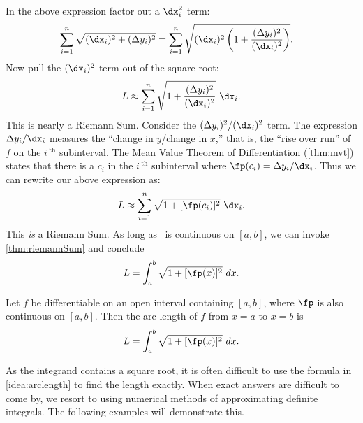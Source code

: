 In the above expression factor out a $\dx_i^2$ term:
\begin{align*}
	\sum_{i=1}^n \sqrt{(\dx_i)^2 + (\Delta y_i)^2}
	&= \sum_{i=1}^n \sqrt{(\dx_i)^2\left(1 + \frac{(\Delta y_i)^2}{(\dx_i)^2}\right)}.
\end{align*}
Now pull the $(\dx_i)^2$ term out of the square root:
\[L\approx\sum_{i=1}^n\sqrt{1 + \frac{(\Delta y_i)^2}{(\dx_i)^2}}\ \dx_i.\]
This is nearly a Riemann Sum. Consider the $(\Delta y_i)^2/(\dx_i)^2$ term. The expression $\Delta y_i/\dx_i$ measures the ``change in $y$/change in $x$,'' that is, the ``rise over run'' of $f$ on the $i\,^\text{th}$ subinterval. The Mean Value Theorem of Differentiation (\autoref{thm:mvt}) states that there is a $c_i$ in the $i\,^\text{th}$ subinterval where $\fp(c_i) = \Delta y_i/\dx_i$. Thus we can rewrite our above expression as:
\[L\approx\sum_{i=1}^n\sqrt{1+[\fp(c_i)]^2}\ \dx_i.\]
This \textit{is} a Riemann Sum. As long as \fp\ is continuous on $[a,b]$, we can invoke \autoref{thm:riemannSum} and conclude
\[L=\int_a^b\sqrt{1+[\fp(x)]^2}\ dx.\]

{Let $f$ be differentiable on an open interval containing $[a,b]$, where $\fp$ is also continuous on $[a,b]$. Then the arc length of $f$ from $x=a$ to $x=b$ is
\[L = \int_a^b \sqrt{1+[\fp(x)]^2}\ dx.\]}


As the integrand contains a square root, it is often difficult to use the formula in \autoref{idea:arclength} to find the length exactly. When exact answers are difficult to come by, we resort to using numerical methods of approximating definite integrals. The following examples will demonstrate this.


